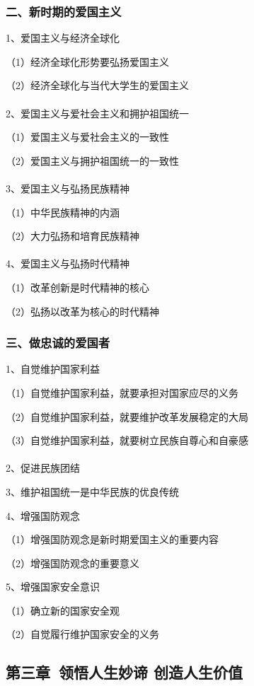 \documentclass{ctexart}
\begin{document}
\subsubsection{二、新时期的爱国主义}
1、爱国主义与经济全球化

（1）经济全球化形势要弘扬爱国主义

（2）经济全球化与当代大学生的爱国主义
\\\\

2、爱国主义与爱社会主义和拥护祖国统一

（1）爱国主义与爱社会主义的一致性

（2）爱国主义与拥护祖国统一的一致性
\\\\

3、爱国主义与弘扬民族精神

（1）中华民族精神的内涵

（2）大力弘扬和培育民族精神
\\\\

4、爱国主义与弘扬时代精神

（1）改革创新是时代精神的核心

（2）弘扬以改革为核心的时代精神

\subsubsection{三、做忠诚的爱国者}

1、自觉维护国家利益

（1）自觉维护国家利益，就要承担对国家应尽的义务

（2）自觉维护国家利益，就要维护改革发展稳定的大局

（3）自觉维护国家利益，就要树立民族自尊心和自豪感
\\\\

2、促进民族团结

3、维护祖国统一是中华民族的优良传统

4、增强国防观念

（1）增强国防观念是新时期爱国主义的重要内容

（2）增强国防观念的重要意义

5、增强国家安全意识

（1）确立新的国家安全观

（2）自觉履行维护国家安全的义务

\subsection{第三章\ 领悟人生妙谛 创造人生价值}
\end{document}

